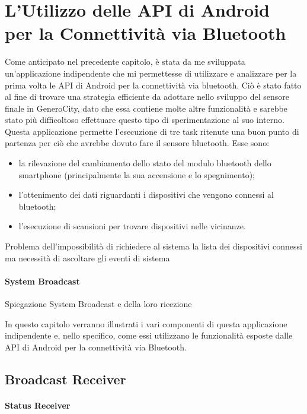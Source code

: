 \chapter{L'Utilizzo delle API di Android per la Connettività via Bluetooth}

Come anticipato nel precedente capitolo, è stata da me sviluppata un'applicazione indipendente che mi permettesse di utilizzare e analizzare per la prima volta le API di Android per la connettività via bluetooth\cite{ref:bluetooth-doc}. Ciò è stato fatto al fine di trovare una strategia efficiente da adottare nello sviluppo del sensore finale in GeneroCity, dato che essa contiene molte altre funzionalità e sarebbe stato più difficoltoso effettuare questo tipo di sperimentazione al suo interno. Questa applicazione permette l'esecuzione di tre task ritenute una buon punto di partenza per ciò che avrebbe dovuto fare il sensore bluetooth. Esse sono:
\begin{itemize}
    \item la rilevazione del cambiamento dello stato del modulo bluetooth dello smartphone (principalmente la sua accensione e lo spegnimento);
    \item l'ottenimento dei dati riguardanti i dispositivi che vengono connessi al bluetooth;
    \item l'esecuzione di scansioni per trovare dispositivi nelle vicinanze.
\end{itemize}

Problema dell'impossibilità di richiedere al sistema la lista dei dispositivi connessi ma necessità di ascoltare gli eventi di sistema

\subsubsection{System Broadcast}
Spiegazione System Broadcast e della loro ricezione

In questo capitolo verranno illustrati i vari componenti di questa applicazione indipendente e, nello specifico, come essi utilizzano le funzionalità esposte dalle API di Android per la connettività via Bluetooth. 


\section{Broadcast Receiver}

\subsubsection{Status Receiver}

